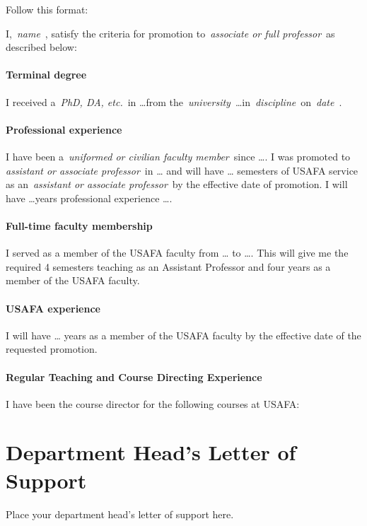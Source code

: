 \documentclass[11pt,titlepage]{article}
\providecommand*{\meta}[1]{%
  \textlangle\,\emph{#1}\,\textrangle%
}
\begin{document}
Follow this format:

I, \meta{name}, satisfy the criteria for promotion to \meta{associate or full professor} as described below:

\paragraph{Terminal degree}
I received a \meta{PhD, DA, etc.} in \dots from the \meta{university} \dots in \meta{discipline} on \meta{date}.

\paragraph{Professional experience}
I have been a \meta{uniformed or civilian faculty member} since \dots.
I was promoted to \meta{assistant or associate professor} in \dots{} and will have \dots{} semesters of USAFA service as an \meta{assistant or associate professor} by the effective date of promotion.
I will have \dots years professional experience \dots.

\paragraph{Full-time faculty membership}
I served as a member of the USAFA faculty from \dots{} to \dots.
This will give me the required 4 semesters teaching as an Assistant Professor and four years as a member of the USAFA faculty.

\paragraph{USAFA experience}
I will have \dots{} years as a member of the USAFA faculty by the effective date of the requested promotion.

\paragraph{Regular Teaching and Course Directing Experience}
I have been the course director for the following courses at USAFA:

\section{Department Head's Letter of Support}  %
Place your department head's letter of support here.
\end{document}
